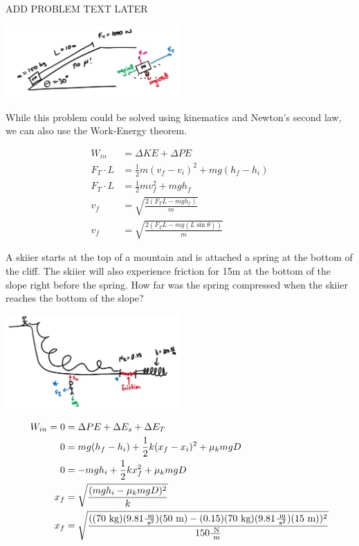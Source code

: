 \begin{problem}
    ADD PROBLEM TEXT LATER

    \begin{center}
        \includegraphics[width=0.5\textwidth]{chapters/ch4/images/fig4_5.PNG}
    \end{center}

    While this problem could be solved using kinematics and Newton's second law, we can also use the Work-Energy theorem. 

    $$
    \begin{aligned}
        W_{in} &= \Delta KE + \Delta PE\\
        F_T \cdot L &= \frac{1}{2}m(v_f - v_i)^2 + mg(h_f - h_i)\\
        F_T \cdot L &= \frac{1}{2}mv_f^2 + mgh_f\\
        v_f &= \sqrt{\frac{2(F_TL - mgh_f)}{m}}\\
        v_f &= \sqrt{\frac{2(F_TL - mg(L\sin\theta))}{m}}
    \end{aligned}
    $$
\end{problem}

\begin{problem}
    A skiier starts at the top of a mountain and is attached a spring at the bottom of the cliff. The skiier will also experience friction for 15m at the bottom of the slope right before the spring. How far was the spring compressed when the skiier reaches the bottom of the slope?

    \begin{center}
        \includegraphics[width=0.5\textwidth]{chapters/ch4/images/fig4_6.PNG}
    \end{center}

    $$
    \begin{aligned}
        W_{in} = 0 &= \Delta PE + \Delta E_s + \Delta E_{T}\\
        0 &= mg(h_f-h_i) + \frac{1}{2}k(x_f-x_i)^2 + \mu_kmgD\\
        0 &= -mgh_i + \frac{1}{2}kx_f^2 + \mu_kmgD\\
        x_f &= \sqrt{\frac{(mgh_i-\mu_kmgD)^2}{k}}\\
        x_f &= \sqrt{\frac{((70\text{ kg})(9.81\frac{\text{ m}}{\text{ s}^2})(50\text{ m})-(0.15)(70\text{ kg})(9.81\frac{\text{ m}}{\text{ s}^2})(15\text{ m}))^2}{150 \frac{\text{ N}}{\text{ m}}}}\\
    \end{aligned}
    $$
\end{problem}


